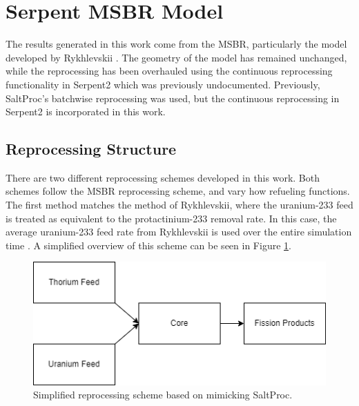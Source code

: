 







\section{Serpent MSBR Model}

The results generated in this work come from the MSBR, particularly the model developed by Rykhlevskii \cite{rykhlevskii_advanced_2018}. The geometry of the model has remained unchanged, while the reprocessing has been overhauled using the continuous reprocessing functionality in Serpent2 which was previously undocumented. Previously, SaltProc's batchwise reprocessing was used, but the continuous reprocessing in Serpent2 is incorporated in this work.

\subsection{Reprocessing Structure}

There are two different reprocessing schemes developed in this work. Both schemes follow the MSBR reprocessing scheme, and vary how refueling functions. The first method matches the method of Rykhlevskii, where the uranium-233 feed is treated as equivalent to the protactinium-233 removal rate. In this case, the average uranium-233 feed rate from Rykhlevskii is used over the entire simulation time \cite{rykhlevskii_advanced_2018}. A simplified overview of this scheme can be seen in Figure \ref{fig:spmatchrepr}.


\begin{figure}[H]
  \centering
  \includegraphics[scale=0.45]{images/sp-match-repr-scheme.png}
  \caption{Simplified reprocessing scheme based on mimicking SaltProc.}
   \label{fig:spmatchrepr}
\end{figure}

